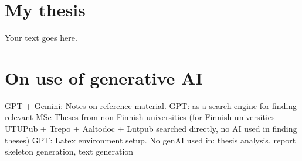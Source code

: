 \documentclass{article}
\begin{document}
\newpage
\section*{My thesis}

Your text goes here.



\newpage
\printbibliography[heading=bibintoc,title={References}]







\newpage
\appendix

\section{On use of generative AI}

GPT + Gemini: Notes on reference material. 
GPT: as a search engine for finding relevant MSc Theses from non-Finnish 
universities (for Finnish universities UTUPub + Trepo + Aaltodoc + Lutpub 
searched directly, no AI used in finding theses)
GPT: Latex environment setup. 
No genAI used in: thesis analysis, report skeleton generation, text generation
\end{document}
